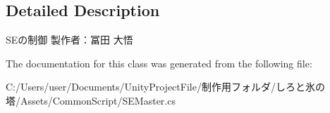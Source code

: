 \subsection{Detailed Description}
S\+Eの制御 製作者：冨田 大悟 



The documentation for this class was generated from the following file\+:\begin{DoxyCompactItemize}
\item 
C\+:/\+Users/user/\+Documents/\+Unity\+Project\+File/制作用フォルダ/しろと氷の塔/\+Assets/\+Common\+Script/S\+E\+Master.\+cs\end{DoxyCompactItemize}
